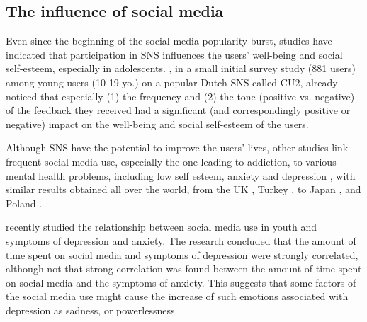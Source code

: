 \documentclass[a4paper,fleqn]{cas-dc}
\begin{document}
\subsection{The influence of  social media}

Even since the beginning of the social media popularity burst, studies have indicated that  participation in SNS  influences  the users' well-being and social self-esteem, especially in adolescents. \citet{valkenburg2006friend}, in a small initial survey study (881 users) among young users (10-19 yo.) on a popular Dutch SNS called CU2, already noticed that especially  (1) the frequency  and (2) the tone (positive vs. negative) of the feedback they received had a significant (and correspondingly positive or negative) impact on the well-being and social self-esteem of the users.

Although SNS have the potential to  improve the users' lives, other studies link frequent social media use, especially the one leading to addiction,  to various mental health problems, including low self esteem, anxiety and depression  
\citep{beran2005cyber, hinduja2008cyberbullying,campbell2012victims,woods2016sleepyteens}, with similar results obtained all over the world, from the UK \citep{kelly2018social}, Turkey \citep{kircaburun2016self}, to Japan \citep{kitazawa2018associations}, and Poland \citep{pyzalski2019polish}.

\citet{culpepperexploring} recently studied the relationship between social media use in youth and symptoms of depression and anxiety. The research concluded that the amount of time spent on social media and symptoms of depression were strongly correlated, although not that strong correlation was found between the amount of time spent on social media and the symptoms of anxiety. This suggests that some factors of the social media use might cause the increase of such emotions associated with depression as sadness, or powerlessness.
\end{document}
